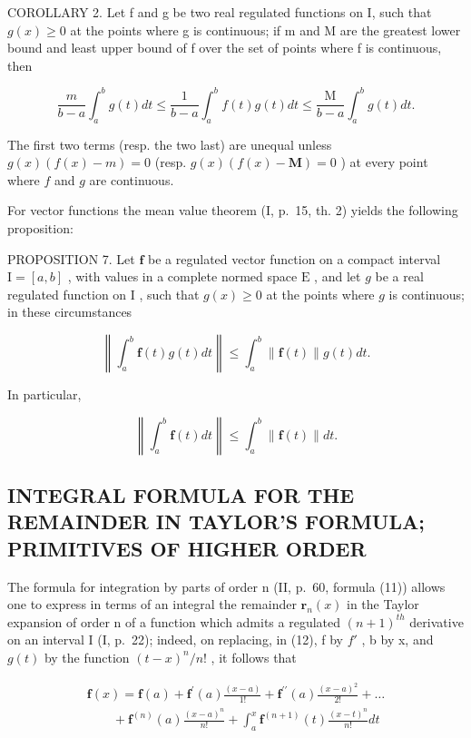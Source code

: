COROLLARY 2. Let f and g be two real regulated functions on I, such that \(g(x) \geqslant 0\) at the points where g is continuous; if m and M are the greatest lower bound and least upper bound of f over the set of points where f is continuous, then

\[
\frac {m}{b - a} \int_ {a} ^ {b} g (t) d t \leqslant \frac {1}{b - a} \int_ {a} ^ {b} f (t) g (t) d t \leqslant \frac {\mathrm{M}}{b - a} \int_ {a} ^ {b} g (t) d t.\tag{14}
\]

The first two terms (resp. the two last) are unequal unless \(g(x)(f(x) - m) = 0\) (resp. \(g(x)(f(x) - \mathbf{M}) = 0\) ) at every point where \(f\) and \(g\) are continuous.

For vector functions the mean value theorem (I, p.~15, th. 2) yields the following proposition:

PROPOSITION 7. Let \(\mathbf{f}\) be a regulated vector function on a compact interval \(\mathrm{I} = [a, b]\) , with values in a complete normed space \(\mathrm{E}\) , and let \(g\) be a real regulated function on \(\mathrm{I}\) , such that \(g(x) \geqslant 0\) at the points where \(g\) is continuous; in these circumstances

\[
\left\| \int_ {a} ^ {b} \mathbf {f} (t) g (t) d t \right\| \leqslant \int_ {a} ^ {b} \| \mathbf {f} (t) \| g (t) d t.\tag{15}
\]

In particular,

\[
\left\| \int_ {a} ^ {b} \mathbf {f} (t) d t \right\| \leqslant \int_ {a} ^ {b} \| \mathbf {f} (t) \| d t.\tag{16}
\]

\subsection{INTEGRAL FORMULA FOR THE REMAINDER IN TAYLOR'S FORMULA; PRIMITIVES OF HIGHER ORDER}

The formula for integration by parts of order n (II, p.~60, formula (11)) allows one to express in terms of an integral the remainder \(\mathbf{r}_{n}(x)\) in the Taylor expansion of order n of a function which admits a regulated \((n+1)^{th}\) derivative on an interval I (I, p.~22); indeed, on replacing, in (12), f by \(f'\) , b by x, and \(g(t)\) by the function \((t-x)^{n}/n!\) , it follows that

\[
\begin{array}{l} \mathbf {f} (x) = \mathbf {f} (a) + \mathbf {f} ^ {\prime} (a) \frac {(x - a)}{1 !} + \mathbf {f} ^ {\prime \prime} (a) \frac {(x - a) ^ {2}}{2 !} + \dots \\ \qquad + \mathbf {f} ^ {(n)} (a) \frac {(x - a) ^ {n}}{n !} + \int_ {a} ^ {x} \mathbf {f} ^ {(n + 1)} (t) \frac {(x - t) ^ {n}}{n !} d t \end{array}\tag{17}
\]

